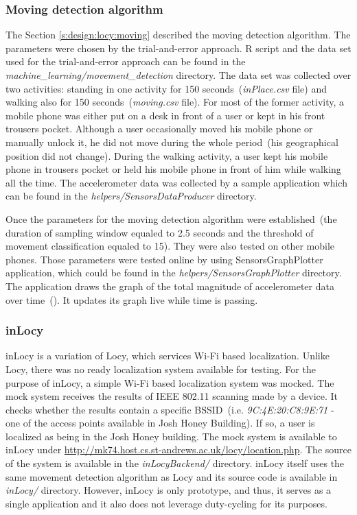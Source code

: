 \subsubsection{Moving detection algorithm}
\label{s:implementation:moving}
\hspace{10pt} The Section \ref{s:design:locy:moving} described the moving detection algorithm. The parameters were chosen by the trial-and-error approach. R script and the data set used for the trial-and-error approach can be found in the \textit{machine\_learning/movement\_detection} directory. The data set was collected over two activities: standing in one activity for 150 seconds\ (\textit{inPlace.csv} file) and walking also for 150 seconds\ (\textit{moving.csv} file). For most of the former activity, a mobile phone was either put on a desk in front of a user or kept in his front trousers pocket. Although a user occasionally moved his mobile phone or manually unlock it, he did not move during the whole period\ (his geographical position did not change). During the walking activity, a user kept his mobile phone in trousers pocket or held his mobile phone in front of him while walking all the time. The accelerometer data was collected by a sample application which can be found in the \textit{helpers/SensorsDataProducer} directory.

Once the parameters for the moving detection algorithm were established\ (the duration of sampling window equaled to 2.5 seconds and the threshold of movement classification equaled to 15). They were also tested on other mobile phones. Those parameters were tested online by using SensorsGraphPlotter application, which could be found in the \textit{helpers/SensorsGraphPlotter} directory. The application draws the graph of the total magnitude of accelerometer data over time\ (). It updates its graph live while time is passing.


\subsubsection{inLocy}
inLocy is a variation of Locy, which services Wi-Fi based localization. Unlike Locy, there was no ready localization system available for testing. For the purpose of inLocy, a simple Wi-Fi based localization system was mocked. The mock system receives the results of IEEE 802.11 scanning made by a device. It checks whether the results contain a specific BSSID\ (i.e. \textit{9C:4E:20:C8:9E:71} - one of the access points available in Josh Honey Building). If so, a user is localized as being in the Josh Honey building. The mock system is available to inLocy under \url{http://mk74.host.cs.st-andrews.ac.uk/locy/location.php}. The source of the system is available in the \textit{inLocyBackend/} directory. inLocy itself uses the same movement detection algorithm as Locy and its source code is available in \textit{inLocy/} directory. However, inLocy is only prototype, and thus, it serves as a single application and it also does not leverage duty-cycling for its purposes. 

